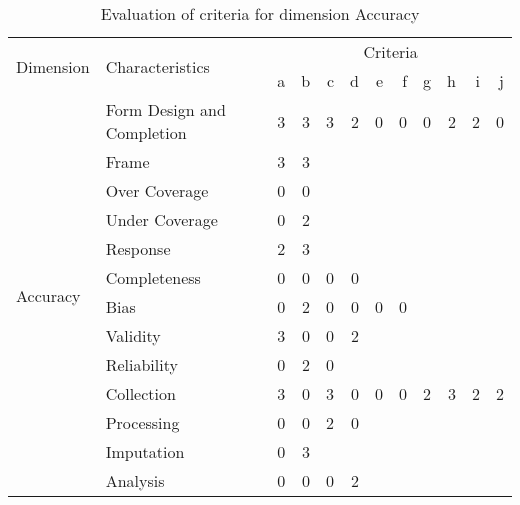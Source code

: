 \begin{table}[htbp]
    \centering

    \begin{tabular}{llrrrrrrrrrr}
        \toprule
        \multirow{2}{*}{Dimension}  & \multirow{2}{*}{Characteristics}  & \multicolumn{10}{c}{Criteria}         \\ \cmidrule(lr){3-12}
                                    &                                   & a & b & c & d & e & f & g & h & i & j \\ \midrule
        \multirow{13}{*}{Accuracy}  & Form Design and Completion        & 3 & 3 & 3 & 2 & 0 & 0 & 0 & 2 & 2 & 0 \\
                                    & Frame                             & 3 & 3 &   &   &   &   &   &   &   &   \\
                                    & Over Coverage                     & 0 & 0 &   &   &   &   &   &   &   &   \\
                                    & Under Coverage                    & 0 & 2 &   &   &   &   &   &   &   &   \\
                                    & Response                          & 2 & 3 &   &   &   &   &   &   &   &   \\
                                    & Completeness                      & 0 & 0 & 0 & 0 &   &   &   &   &   &   \\
                                    & Bias                              & 0 & 2 & 0 & 0 & 0 & 0 &   &   &   &   \\
                                    & Validity                          & 3 & 0 & 0 & 2 &   &   &   &   &   &   \\
                                    & Reliability                       & 0 & 2 & 0 &   &   &   &   &   &   &   \\
                                    & Collection                        & 3 & 0 & 3 & 0 & 0 & 0 & 2 & 3 & 2 & 2 \\
                                    & Processing                        & 0 & 0 & 2 & 0 &   &   &   &   &   &   \\
                                    & Imputation                        & 0 & 3 &   &   &   &   &   &   &   &   \\
                                    & Analysis                          & 0 & 0 & 0 & 2 &   &   &   &   &   &   \\
        \bottomrule
    \end{tabular}

    \caption{Evaluation of criteria for dimension Accuracy}
    \label{table:accuracy-benchmark}
\end{table}
\FloatBarrier

